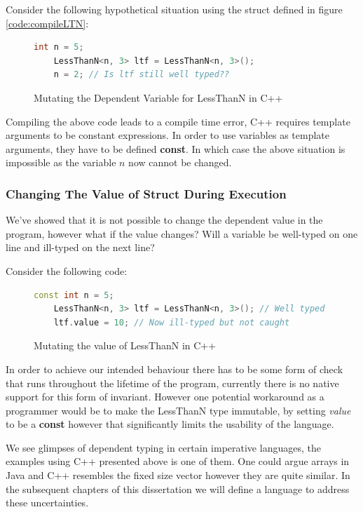 \documentclass[a4paper,12pt]{report}
\begin{document}
\par
Consider the following hypothetical situation using the struct defined in 
figure \ref{code:compileLTN}: 

\begin{figure}[H]
  \begin{lstlisting}[language=c++]     
    int n = 5;
    LessThanN<n, 3> ltf = LessThanN<n, 3>();
    n = 2; // Is ltf still well typed??
  \end{lstlisting}
  \caption{Mutating the Dependent Variable for LessThanN in C++}
\end{figure}

\par
Compiling the above code leads to a compile time error, C++ requires template 
arguments to be constant expressions. In order to use variables as template 
arguments, they have to be defined \textbf{const}. In which case the above 
situation is impossible as the variable $n$ now cannot be changed. 

\subsubsection{Changing The Value of Struct During Execution}
We've showed that it is not possible to change the dependent value in 
the program, however what if the value changes? Will a 
variable be well-typed on one line and ill-typed on the next line? 

\par
Consider the following code: 
\begin{figure}[H]
  \begin{lstlisting}[language=c++]     
    const int n = 5;
    LessThanN<n, 3> ltf = LessThanN<n, 3>(); // Well typed
    ltf.value = 10; // Now ill-typed but not caught
  \end{lstlisting}
  \caption{Mutating the value of LessThanN in C++}
\end{figure}

\par
In order to achieve our intended behaviour there has to be some form of check 
that runs throughout the lifetime of the program, currently there is no native 
support for this form of invariant. However one potential workaround as a 
programmer would be to make the LessThanN type immutable, by setting \textit{value} 
to be a \textbf{const} however that significantly limits the usability of the 
language. 

\par
We see glimpses of dependent typing in certain imperative languages, the 
examples using C++ presented above is one of them. One could argue arrays in 
Java and C++ resembles the fixed size vector however they are quite similar. In 
the subsequent chapters of this dissertation we will define a language to 
address these uncertainties. 
\end{document}
